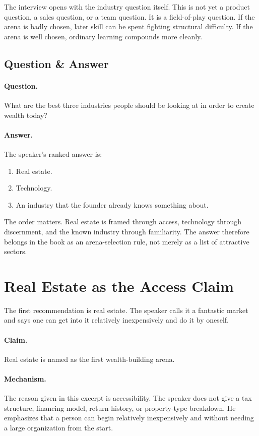 \documentclass[11pt,oneside]{book}
\begin{document}
The interview opens with the industry question itself. This is not yet a product question, a sales question, or a team question. It is a field-of-play question. If the arena is badly chosen, later skill can be spent fighting structural difficulty. If the arena is well chosen, ordinary learning compounds more cleanly.

\subsection{Question \& Answer}

\paragraph{Question.}
What are the best three industries people should be looking at in order to create wealth today?

\paragraph{Answer.}
The speaker's ranked answer is:

\begin{enumerate}
\item Real estate.
\item Technology.
\item An industry that the founder already knows something about.
\end{enumerate}

The order matters. Real estate is framed through access, technology through discernment, and the known industry through familiarity. The answer therefore belongs in the book as an arena-selection rule, not merely as a list of attractive sectors.

\section{Real Estate as the Access Claim}

The first recommendation is real estate. The speaker calls it a fantastic market and says one can get into it relatively inexpensively and do it by oneself.

\paragraph{Claim.}
Real estate is named as the first wealth-building arena.

\paragraph{Mechanism.}
The reason given in this excerpt is accessibility. The speaker does not give a tax structure, financing model, return history, or property-type breakdown. He emphasizes that a person can begin relatively inexpensively and without needing a large organization from the start.
\end{document}
